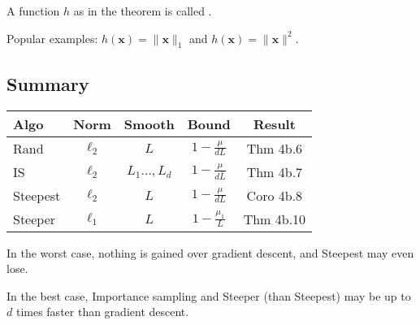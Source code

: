 A function $h$ as in the theorem is called .

Popular examples:  $h(\mathbf{x})=\|\mathbf{x}\|_{1}$ and $h(\mathbf{x})=\|\mathbf{x}\|^{2}$.






\subsection*{Summary}
\begin{tabular}{l|c|c|c|c} 
Algo & Norm & Smooth & Bound & Result \\
\hline Rand & $\ell_{2}$ & $L$ & $1-\frac{\mu}{d L}$ & Thm 4b.6 \\
IS & $\ell_{2}$ & $L_{1} \ldots, L_{d}$ & $1-\frac{\mu}{d \bar{L}}$ & Thm 4b.7 \\
Steepest & $\ell_{2}$ & $L$ & $1-\frac{\mu}{d L}$ & Coro 4b.8 \\
Steeper & $\ell_{1}$ & $L$ & $1-\frac{\mu_1}{L}$ & Thm 4b.10
\end{tabular}
In the worst case, nothing is gained over gradient descent, and Steepest may even lose. 

In the best case, Importance sampling and Steeper (than Steepest) may be up to $d$ times faster than gradient descent.


